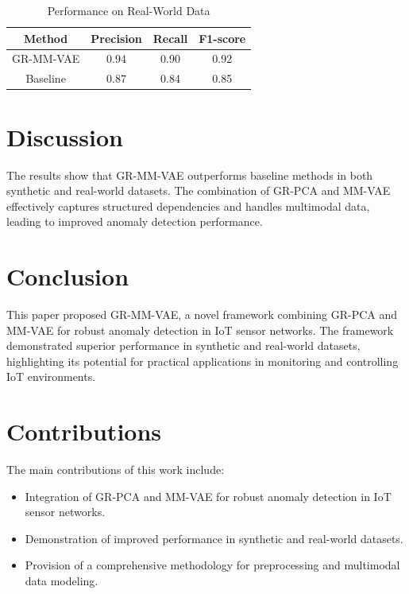 \documentclass[12pt]{article}
\begin{document}
\begin{table}[ht]
\centering
\caption{Performance on Real-World Data}
\label{tab:real_world_data_performance}
\begin{tabular}{|c|c|c|c|}
\hline
Method & Precision & Recall & F1-score \\
\hline
GR-MM-VAE & 0.94 & 0.90 & 0.92 \\
Baseline & 0.87 & 0.84 & 0.85 \\
\hline
\end{tabular}
\end{table}

\section{Discussion}
\label{sec:discussion}
The results show that GR-MM-VAE outperforms baseline methods in both synthetic and real-world datasets. The combination of GR-PCA and MM-VAE effectively captures structured dependencies and handles multimodal data, leading to improved anomaly detection performance.

\section{Conclusion}
\label{sec:conclusion}
This paper proposed GR-MM-VAE, a novel framework combining GR-PCA and MM-VAE for robust anomaly detection in IoT sensor networks. The framework demonstrated superior performance in synthetic and real-world datasets, highlighting its potential for practical applications in monitoring and controlling IoT environments.

\section{Contributions}
\label{sec:contributions}
The main contributions of this work include:
\begin{itemize}
    \item Integration of GR-PCA and MM-VAE for robust anomaly detection in IoT sensor networks.
    \item Demonstration of improved performance in synthetic and real-world datasets.
    \item Provision of a comprehensive methodology for preprocessing and multimodal data modeling.
\end{itemize}



\end{document}
